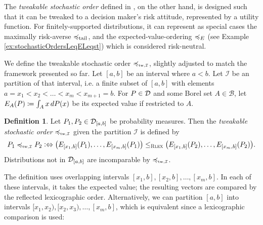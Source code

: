 \documentclass[a4paper,DIV=11]{scrreprt}
\newcommand{\B}{\mathcal{B}}
\theoremstyle{definition}
\newtheorem{defn}[thm]{Definition} %
\begin{document}
    The \emph{tweakable stochastic order} defined in \cite{bib:tweakableStochasticOrders}, on the other hand,
    is designed such that it can be tweaked to a decision maker's risk attitude, represented by a utility function.
    For finitely-supported distributions, it can represent as special cases the maximally risk-averse $\preccurlyeq_{\text{tail}}$, and the expected-value-ordering $\preccurlyeq_E$ (see Example \ref{ex:stochasticOrdersLeqELeqst}) which is considered risk-neutral.
    
    We define the tweakable stochastic order $\leqtw$, slightly adjusted to match the framework presented so far.
    Let $[a, b]$ be an interval where $a < b$. Let $\mathcal{I}$ be an partition of that interval, i.e. a finite subset of $[a, b]$ with elements $a = x_1 < x_2 < \dots < x_m < x_{m+1} = b$.
    For $P \in \mathcal{D}$ and some Borel set $A \in \B$, let $E_A(P) \coloneqq \int_{A} x \, dP(x)$ be its expected value if restricted to $A$.
    \begin{defn}
        \label{def:tweakableStochasticOrder}
        Let $P_1, P_2 \in \mathcal{D}_{[a, b]}$ be probability measures.
        Then the \emph{tweakable stochastic order} $\leqtw$ given the partition $\mathcal{I}$ is defined by
        \begin{gather*}
            P_1 \leqtw P_2 \colonlra \bigpars{E_{[x_1, b]}(P_{1}), \dots, E_{[x_m, b]}(P_1)} \leqRlex \bigpars{E_{[x_1, b]}(P_2), \dots, E_{[x_m, b]}(P_2)}.
        \end{gather*}
        Distributions not in $\mathcal{D}_{[a, b]}$ are incomparable by $\leqtw$.
    \end{defn}

    The definition uses overlapping intervals $[x_1, b], [x_2, b], \dots, [x_m, b]$. In each of these intervals, it takes the expected value; the resulting vectors are compared by the reflected lexicographic order. Alternatively, we can partition $[a, b]$ into intervals $[x_1, x_2), [x_2, x_3), \dots, [x_m, b]$, which is equivalent since a lexicographic comparison is used:
\end{document}

